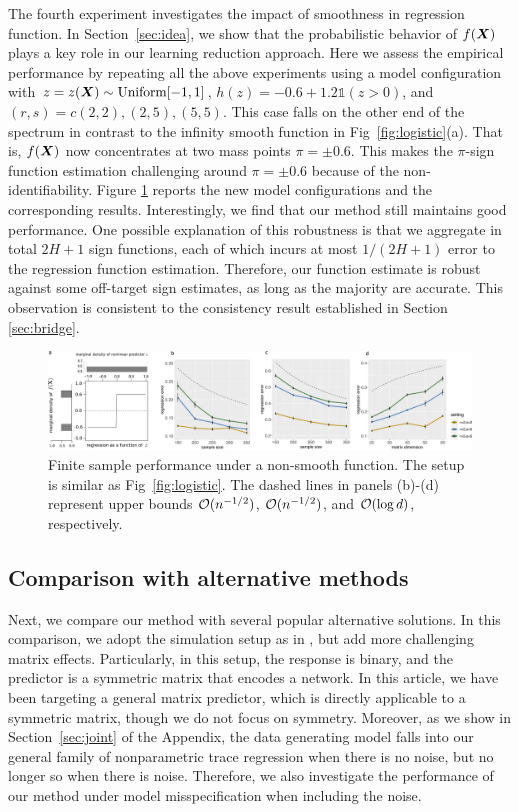 \documentclass[aos]{imsart}
\theoremstyle{definition}
\begin{document}
The fourth experiment investigates the impact of smoothness in regression function. In Section~\ref{sec:idea}, we show that the probabilistic behavior of $f(\bm X)$ plays a key role in our learning reduction approach. Here we assess the empirical performance by repeating all the above experiments using a model configuration with $z=z(\bm X)\sim \text{Uniform}[-1,1]$, $h(z)=-0.6+1.2\mathds{1}(z>0)$, and $(r,s)=c(2,2),(2,5),(5,5)$. This case falls on the other end of the spectrum in contrast to the infinity smooth function in Fig~\ref{fig:logistic}(a). That is, $f(\bm X)$ now concentrates at two mass points $\pi=\pm 0.6$. This makes the $\pi$-sign function estimation challenging around $\pi=\pm 0.6$ because of the non-identifiability. Figure \ref{fig:step} reports the new model configurations and the corresponding results. Interestingly, we find that our method still maintains good performance. One possible explanation of this robustness is that we aggregate in total $2H+1$ sign functions, each of which incurs at most $1/(2H+1)$ error to the regression function estimation. Therefore, our function estimate is robust against some off-target sign estimates, as long as the majority are accurate. This observation is consistent to the consistency result established in Section \ref{sec:bridge}.

\begin{figure}[t!]
\centering
\includegraphics[width=\textwidth]{figure/combined_steps.pdf}
\caption{Finite sample performance under a non-smooth function. The setup is similar as Fig~\ref{fig:logistic}. The dashed lines in panels (b)-(d) represent upper bounds $\mathcal{O}(n^{-1/2})$, $\mathcal{O}(n^{-1/2})$, and $\mathcal{O}(\log d)$, respectively.}
\label{fig:step}
\end{figure}



\subsection{Comparison with alternative methods}
\label{sec:comparison}

Next, we compare our method with several popular alternative solutions. In this comparison, we adopt the simulation setup as in \cite{relion2019network}, but add more challenging matrix effects. Particularly, in this setup, the response is binary, and the predictor is a symmetric matrix that encodes a network. In this article, we have been targeting a general matrix predictor, which is directly applicable to a symmetric matrix, though we do not focus on symmetry. Moreover, as we show in Section~\ref{sec:joint} of the Appendix, the data generating model falls into our general family of nonparametric trace regression when there is no noise, but no longer so when there is noise. Therefore, we also investigate the performance of our method under model misspecification when including the noise. 
\end{document}
